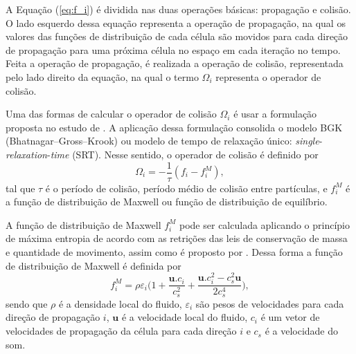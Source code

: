 A Equação (\ref{eq:f_i}) é dividida nas duas operações básicas: propagação e colisão. O lado esquerdo dessa equação representa a operação de propagação, na qual os valores das funções de distribuição de cada célula são movidos para cada direção de propagação para uma próxima célula no espaço em cada iteração no tempo. Feita a operação de propagação, é realizada a operação de colisão, representada pelo lado direito da equação, na qual o termo $\Omega_{i}$ representa o operador de colisão.

Uma das formas de calcular o operador de colisão $\Omega_{i}$ é usar a formulação proposta no estudo de . A aplicação dessa formulação consolida o modelo BGK (Bhatnagar–Gross–Krook) ou modelo de tempo de relaxação único: \textit{single}-\textit{relaxation}-\textit{time} (SRT). Nesse sentido, o operador de colisão é definido por
\begin{equation}
	\Omega_{i} = -\frac{1}{\tau}(f_{i} - f_{i}^{M}),
    \label{eq:omega_i}
\end{equation}
tal que $\tau$ é o período de colisão, período médio de colisão entre partículas, e $f_{i}^{M}$ é a função de distribuição de Maxwell ou função de distribuição de equilíbrio.

A função de distribuição de Maxwell $f_{i}^{M}$ pode ser calculada aplicando o princípio de máxima entropia de acordo com as retrições das leis de conservação de massa e quantidade de movimento, assim como é proposto por . Dessa forma a função de distribuição de Maxwell é definida por
\begin{equation}
	f_{i}^{M} = \rho \varepsilon _{i}\bigg( 1 + \frac{\textbf{u}.c_{i}}{c_{s}^{2}} + \frac{\textbf{u}.c_{i}^{2} - c_{s}^{2}\textbf{u}}{2c_{s}^{4}}\bigg),
    \label{eq:f_i_M}
\end{equation}
sendo que $\rho$ é a densidade local do fluido, $\varepsilon_{i}$ são pesos de velocidades para cada direção de propagação $i$, $\textbf{u}$ é a velocidade local do fluido, $c_{i}$ é um vetor de velocidades de propagação da célula para cada direção $i$ e $c_{s}$ é a velocidade do som.

